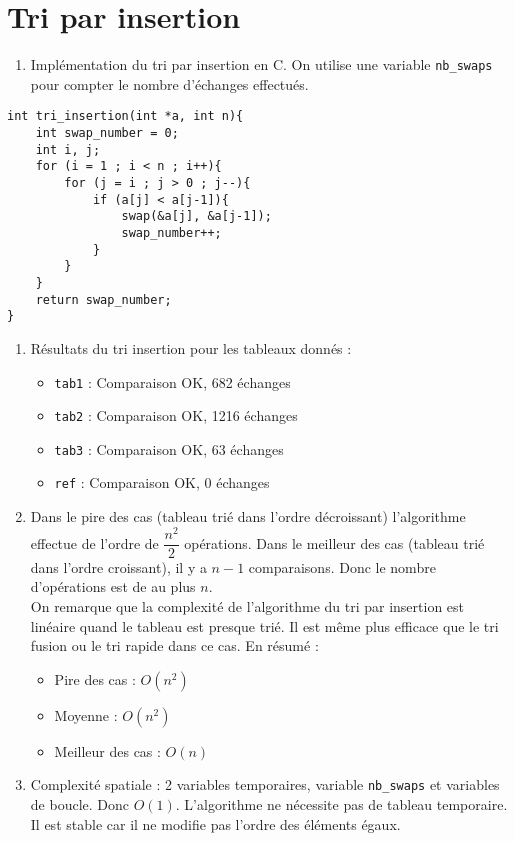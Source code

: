 \documentclass[12pt]{article}
\begin{document}
\section{Tri par insertion}
\begin{enumerate}
    \item Implémentation du tri par insertion en C. On utilise une variable \texttt{nb\_swaps} pour compter le nombre d'échanges effectués.
\end{enumerate}
\begin{lstlisting}[style=languageC, caption=Implémentation du tri par insertion]
int tri_insertion(int *a, int n){
    int swap_number = 0;
    int i, j;
    for (i = 1 ; i < n ; i++){
        for (j = i ; j > 0 ; j--){
            if (a[j] < a[j-1]){
                swap(&a[j], &a[j-1]);
                swap_number++;
            }
        }
    }
    return swap_number;
}
\end{lstlisting}
\begin{enumerate}[resume]
    \item Résultats du tri insertion pour les tableaux donnés :
    \begin{itemize}
        \item \texttt{tab1} : Comparaison OK, 682 échanges
        \item \texttt{tab2} : Comparaison OK, 1216 échanges
        \item \texttt{tab3} : Comparaison OK, 63 échanges
        \item \texttt{ref} : Comparaison OK, 0 échanges
    \end{itemize}
    \item Dans le pire des cas (tableau trié dans l'ordre décroissant) l'algorithme effectue de l'ordre de $\dfrac{n^2}{2}$ opérations. Dans le meilleur des cas (tableau trié dans l'ordre croissant), il y a $n-1$ comparaisons. Donc le nombre d'opérations est de au plus $n$. \\
    On remarque que la complexité de l'algorithme du tri par insertion est linéaire quand le tableau est presque trié. Il est même plus efficace que le tri fusion ou le tri rapide dans ce cas.
    En résumé :
    \begin{itemize}
        \item Pire des cas : $O(n^2)$ 
        \item Moyenne : $O(n^2)$
        \item Meilleur des cas : $O(n)$
    \end{itemize}
    \item Complexité spatiale : 2 variables temporaires, variable \texttt{nb\_swaps} et variables de boucle. Donc $O(1)$. L'algorithme ne nécessite pas de tableau temporaire. Il est stable car il ne modifie pas l'ordre des éléments égaux.
\end{enumerate}
\end{document}
